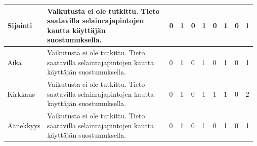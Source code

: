\documentclass[finnish, 12pt, a4paper, elec, utf8, a-1b, online]{aaltothesis}
\begin{document}
{\begin{longtable}{p{2.5cm}|p{6cm}|p{0.5cm}p{0.5cm}p{0.5cm}|p{0.5cm}|p{0.5cm}p{0.5cm}p{0.5cm}|p{0.5cm}|}
    \midrule
    Sijainti                                & Vaikutusta ei ole tutkittu. Tieto saatavilla selainrajapintojen kautta käyttäjän suostumuksella.                                                                                                                                                                                                                                  & 0                                          & 1                                   & 0                                      & 1                            & 0                                               & 1                                         & 0                                         & 1                            \\
    \midrule
    Aika                                    & Vaikutusta ei ole tutkittu. Tieto saatavilla selainrajapintojen kautta käyttäjän suostumuksella.                                                                                                                                                                                                                                  & 0                                          & 1                                   & 0                                      & 1                            & 0                                               & 1                                         & 0                                         & 1                            \\
    \midrule
    Kirkkaus                                & Vaikutusta ei ole tutkittu. Tieto saatavilla selainrajapintojen kautta käyttäjän suostumuksella.                                                                                                                                                                                                                                  & 0                                          & 1                                   & 0                                      & 1                            & 1                                               & 1                                         & 0                                         & 2                            \\
    \midrule
    Äänekkyys                               & Vaikutusta ei ole tutkittu. Tieto saatavilla selainrajapintojen kautta käyttäjän suostumuksella.                                                                                                                                                                                                                                  & 0                                          & 1                                   & 0                                      & 1                            & 0                                               & 1                                         & 0                                         & 1                            \\

\end{longtable}}
\end{document}
